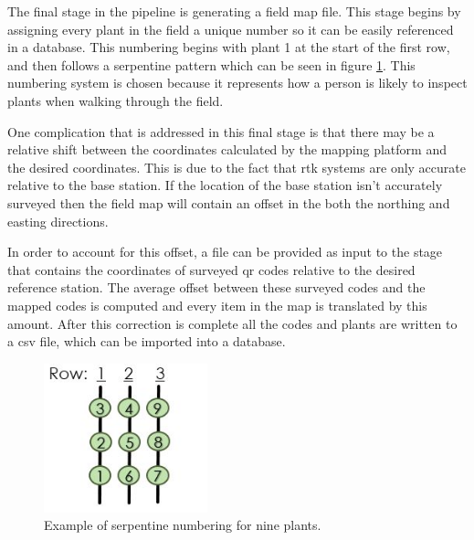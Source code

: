 The final stage in the pipeline is generating a field map file.  This stage begins by assigning every plant in the field a unique number so it can be easily referenced in a database.  This numbering begins with plant 1 at the start of the first row, and then follows a serpentine pattern which can be seen in figure \ref{figure:serpentine}. This numbering system is chosen because it represents how a person is likely to inspect plants when walking through the field.  

One complication that is addressed in this final stage is that there may be a relative shift between the coordinates calculated by the mapping platform and the desired coordinates.  This is due to the fact that \ac{rtk} systems are only accurate relative to the base station.  If the location of the base station isn't accurately surveyed then the field map will contain an offset in the both the northing and easting directions. 

In order to account for this offset, a file can be provided as input to the stage that contains the coordinates of surveyed \ac{qr} codes relative to the desired reference station.  The average offset between these surveyed codes and the mapped codes is computed and every item in the map is translated by this amount. After this correction is complete all the codes and plants are written to a \ac{csv} file, which can be imported into a database.

\begin{figure}
	\centering
    \includegraphics[height=1.7in]{figures/sepentine.jpg}
    \caption[Serpentine numbering]{Example of serpentine numbering for nine plants.}
    \label{figure:serpentine}
\end{figure}

